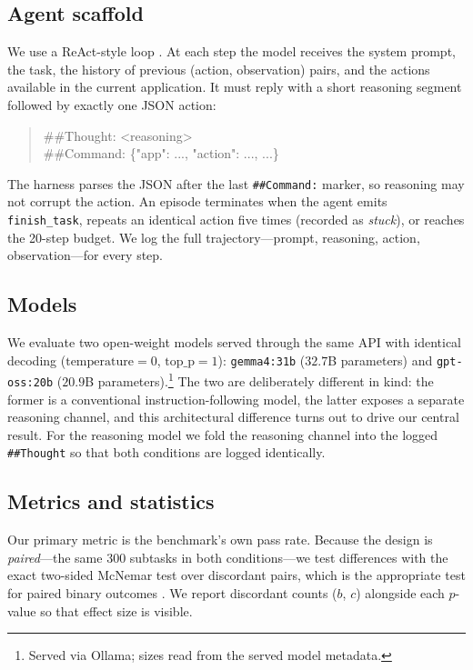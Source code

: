 \documentclass[11pt]{article}
\begin{document}
\subsection{Agent scaffold}
We use a ReAct-style loop \citep{yao2023react}. At each step the model receives the system
prompt, the task, the history of previous (action, observation) pairs, and the actions
available in the current application. It must reply with a short reasoning segment followed by
exactly one JSON action:

\begin{quote}\small\ttfamily
\#\#Thought: \textless reasoning\textgreater \\
\#\#Command: \{"app": ..., "action": ..., ...\}
\end{quote}

The harness parses the JSON after the last \texttt{\#\#Command:} marker, so reasoning may not
corrupt the action. An episode terminates when the agent emits \texttt{finish\_task}, repeats an
identical action five times (recorded as \emph{stuck}), or reaches the 20-step budget. We log the
full trajectory---prompt, reasoning, action, observation---for every step.

\subsection{Models}
We evaluate two open-weight models served through the same API with identical decoding
($\mathrm{temperature}=0$, $\mathrm{top\_p}=1$): \texttt{gemma4:31b} ($32.7$B parameters) and
\texttt{gpt-oss:20b} ($20.9$B parameters).\footnote{Served via Ollama; sizes read from the
served model metadata.} The two are deliberately different in kind: the former is a
conventional instruction-following model, the latter exposes a separate reasoning channel, and
this architectural difference turns out to drive our central result. For the reasoning model we
fold the reasoning channel into the logged \texttt{\#\#Thought} so that both conditions are
logged identically.

\subsection{Metrics and statistics}
Our primary metric is the benchmark's own pass rate. Because the design is \emph{paired}---the
same 300 subtasks in both conditions---we test differences with the exact two-sided McNemar
test over discordant pairs, which is the appropriate test for paired binary outcomes
\citep{mcnemar1947}. We report discordant counts ($b$, $c$) alongside each $p$-value so that
effect size is visible.
\end{document}
